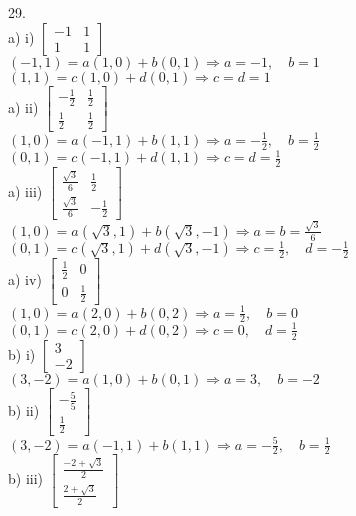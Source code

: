 \documentclass[12pt]{article}
\begin{document}
29.\\
a) i) $\begin{bmatrix}-1&1\\1&1\end{bmatrix}$\\
$(-1,1)=a(1,0)+b(0,1) \Longrightarrow a=-1,\quad b=1$\\
$(1,1)=c(1,0)+d(0,1) \Longrightarrow c=d=1$\\
a) ii) $\begin{bmatrix}-\frac{1}{2}&\frac{1}{2}\\\frac{1}{2}&\frac{1}{2}\end{bmatrix}$\\
$(1,0)=a(-1,1)+b(1,1) \Longrightarrow a = -\frac{1}{2},\quad b=\frac{1}{2}$\\
$(0,1)=c(-1,1)+d(1,1) \Longrightarrow c=d=\frac{1}{2}$\\
a) iii) $\begin{bmatrix}\frac{\sqrt{3}}{6}&\frac{1}{2}\\\frac{\sqrt{3}}{6}&-\frac{1}{2}\end{bmatrix}$\\
$(1,0)=a(\sqrt{3},1)+b(\sqrt{3},-1) \Longrightarrow a=b=\frac{\sqrt{3}}{6}$\\
$(0,1)=c(\sqrt{3},1)+d(\sqrt{3},-1) \Longrightarrow c=\frac{1}{2},\quad d=-\frac{1}{2}$\\
a) iv) $\begin{bmatrix}\frac{1}{2}&0\\0&\frac{1}{2}\end{bmatrix}$\\
$(1,0)=a(2,0)+b(0,2) \Longrightarrow a=\frac{1}{2},\quad b=0$\\
$(0,1)=c(2,0)+d(0,2) \Longrightarrow c=0,\quad d=\frac{1}{2}$\\
b) i) $\begin{bmatrix}3\\-2\end{bmatrix}$\\
$(3,-2)=a(1,0)+b(0,1) \Longrightarrow a=3,\quad b=-2$\\
b) ii) $\begin{bmatrix}-\frac{5}{5}\\\frac{1}{2}\end{bmatrix}$\\
$(3,-2)=a(-1,1)+b(1,1) \Longrightarrow a=-\frac{5}{2},\quad b=\frac{1}{2}$\\
b) iii) $\begin{bmatrix}\frac{-2+\sqrt{3}}{2}\\\frac{2+\sqrt{3}}{2}\end{bmatrix}$\\
\end{document}
